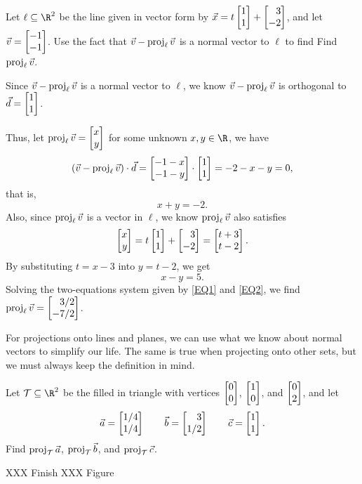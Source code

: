 \begin{example}
	Let $\ell\subseteq \R^2$ be the line given in vector form by $\vec x=t\mat{1\\1}+\mat{3\\-2}$,
	and let $\vec v=\mat{-1\\-1}$. Use the fact that $\vec v-\operatorname{proj}_\ell\vec v$ is a normal vector to $\ell$
	to find Find $\operatorname{proj}_\ell \vec v$.

	Since $\vec v-\operatorname{proj}_\ell\vec v$ is a normal vector to $\ell$, we know $\vec v-\operatorname{proj}_\ell\vec v$ is orthogonal to $\vec d=\mat{1\\1}$. 
	
	Thus, let $\Proj_\ell\vec v = \mat{x\\y}$ for some unknown $x,y\in\R$, we have
	\[
	    (\vec v-\Proj_\ell\vec v)\cdot\vec d=\mat{-1-x\\-1-y}\cdot \mat{1\\1}=-2-x-y=0,
	\]
	that is, 
	\begin{equation}
	\label{EQ1}
	    x+y=-2.
	\end{equation}
	Also, since $\operatorname{proj}_\ell\vec v$ is a vector in $\ell$, we know $\operatorname{proj}_\ell\vec v$ also satisfies
	\[
    	\mat{x\\y}=t\mat{1\\1}+\mat{3\\-2}=\mat{t+3\\t-2}.
	\]
	By substituting $t=x-3$ into $y=t-2$, we get
	\begin{equation}
	\label{EQ2}
	    x-y=5.
	\end{equation}
	Solving the two-equations system given by \eqref{EQ1} and \eqref{EQ2}, we find $\Proj_\ell\vec v = \mat{3/2\\-7/2}$. 
\end{example}

For projections onto lines and planes, we can use what we know about normal vectors to simplify our life.
The same is true when projecting onto other sets, but we must always keep the definition in mind.

\begin{example}
	Let $\mathcal T\subseteq \R^2$ be the filled in triangle with vertices $\mat{0\\0}$, 
	$\mat{1\\0}$, and $\mat{0\\2}$, and let
	\[
		\vec a=\mat{1/4\\1/4}\qquad \vec b=\mat{3\\1/2}\qquad \vec c=\mat{1\\1}.
	\]
	Find $\operatorname{proj}_{\mathcal T}\vec a$, $\operatorname{proj}_{\mathcal T}\vec b$, and  $\operatorname{proj}_{\mathcal T}\vec c$.

	XXX Finish
	XXX Figure
\end{example}

